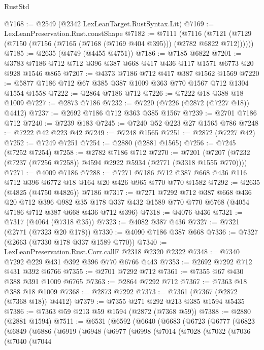 \begin{lexlean}{RustStd}
\begin{coremodule}
@7168 := @2549 (@2342 LexLeanTarget.RustSyntax.Lit)
@7169 := LexLeanPreservation.Rust.constShape
@7182 := @7111
    (@7116 (@7121 (@7129 (@7150 (@7156 (@7165 (@7168 (@7169 @404 @395))) (@2782 @6822 @712))))))
@7185 := @2635 (@4749 (@4455 @4751))
@7186 := @7185 @6822
@7201 := @3783 @7186 @712 @712 @396 @387 @668 @417 @436 @117 @1571 @6773 @20 @928 @1546 @865
@7207 := @4373 @7186 @712 @417 @387 @1562 @1569
@7220 := @5877 @7186 @712 @67 @385 @387 @1009 @363 @770 @1567 @712 @1304 @1554 @1558
@7222 := @2864 @7186 @712
@7226 := @7222 @18 @388 @18 @1009
@7227 := @2873 @7186
@7232 := @7220 (@7226 (@2872 (@7227 @18)) @4412)
@7237 := @2692 @7186 @712 @363 @385 @1567
@7239 := @2701 @7186 @712
@7240 := @7239 @183
@7245 := @7240 @52 @223 @27 @1565 @786
@7248 := @7222 @42 @223 @42
@7249 := @7248 @1565
@7251 := @2872 (@7227 @42)
@7252 := @7249 @7251
@7254 := @2880 (@2881 @1565)
@7256 := @7245 (@7252 @7254)
@7258 := @2782 @7186 @712
@7270 := @7201 (@7207 (@7232 (@7237 (@7256 @7258)) @4594 @2922 @5934 (@2771 (@3318 @1555 @770))))
@7271 := @4009 @7186
@7288 := @7271 @7186 @712 @387 @668 @436 @116 @712 @396 @6772 @18 @164 @20 @426 @965 @770 @770 @1582
@7292 := @2635 (@4825 (@4750 @4826)) @7186
@7317 := @7271
    @7292
    @712
    @387
    @668
    @436
    @20
    @712
    @396
    @982
    @35
    @178
    @337
    @432
    @1589
    @770
    @770
    @6768
    (@4054 @7186 @712 @387 @668 @436 @712 @396)
@7318 := @4076 @436
@7321 := @7317 (@4064 (@7318 @35))
@7323 := @4082 @387 @436
@7327 := @7321 (@2771 (@7323 @20 @178))
@7330 := @4090 @7186 @387 @668
@7336 := @7327 (@2663 (@7330 @178 @337 @1589 @770))
@7340 := LexLeanPreservation.Rust.Corr.callF @2318 @2320 @2322
@7348 := @7340 @7292 @229 @431 @392 @396 @770 @6766 @443
@7353 := @2692 @7292 @712 @431 @392 @6766
@7355 := @2701 @7292 @712
@7361 := @7355 @67 @430 @388 @391 @1009 @6765
@7363 := @2864 @7292 @712
@7367 := @7363 @18 @388 @18 @1009
@7368 := @2873 @7292
@7373 := @7361 (@7367 (@2872 (@7368 @18)) @4412)
@7379 := @7355 @271 @292 @213 @385 @1594 @5435
@7386 := @7363 @59 @213 @59 @1594 (@2872 (@7368 @59))
@7388 := @2880 (@2881 @1594)
@7511 := @6531
    (@6592
      (@6640
        (@6683
          (@6723
            (@6777
              (@6823
                (@6849
                  (@6886
                    (@6919
                      (@6948
                        (@6977
                          (@6998
                            (@7014
                              (@7028
                                (@7032
                                  (@7036
                                    (@7040
                                      (@7044

\end{coremodule}
\end{lexlean}
